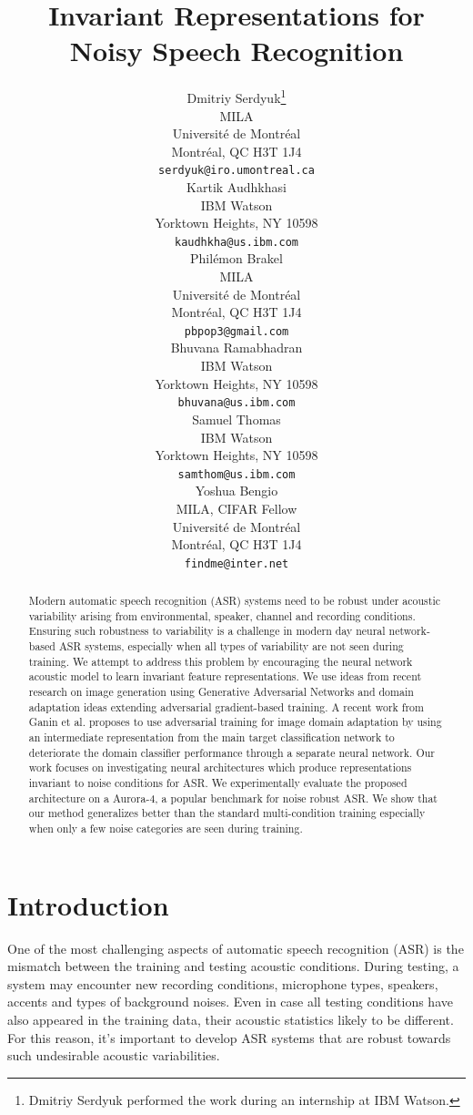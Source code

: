 \documentclass{article}
\title{Invariant Representations for Noisy Speech Recognition}
\author{
  Dmitriy Serdyuk\thanks{Dmitriy Serdyuk performed the work 
    during an internship at IBM Watson.} \\
  MILA\\
  Universit\'e de Montr\'eal\\
  Montr\'eal, QC H3T 1J4 \\
  \texttt{serdyuk@iro.umontreal.ca} \\
  \And
  Kartik Audhkhasi \\
  IBM Watson \\
  Yorktown Heights, NY 10598\\
  \texttt{kaudhkha@us.ibm.com} \\
  \And
  Phil\'emon Brakel \\
  MILA\\
  Universit\'e de Montr\'eal\\
  Montr\'eal, QC H3T 1J4 \\
  \texttt{pbpop3@gmail.com} \\
  \And
  Bhuvana Ramabhadran\\
  IBM Watson\\
  Yorktown Heights, NY 10598\\
  \texttt{bhuvana@us.ibm.com} \\
  \And
  Samuel Thomas\\
  IBM Watson\\
  Yorktown Heights, NY 10598\\
  \texttt{samthom@us.ibm.com} \\
  \And
  Yoshua Bengio\\
  MILA, CIFAR Fellow\\
  Universit\'e de Montr\'eal\\
  Montr\'eal, QC H3T 1J4 \\
  \texttt{findme@inter.net} \\
}
\begin{document}
%
\maketitle
%
\begin{abstract}
    Modern automatic speech recognition (ASR) systems need to be robust under acoustic variability arising from environmental, speaker, channel and recording conditions. Ensuring such robustness to variability is a challenge in modern day neural network-based ASR systems, especially when all types of variability are not seen during training. We attempt to address this problem by encouraging the neural network acoustic model to learn invariant feature representations.
    We use ideas from recent research on image generation using
    Generative Adversarial Networks and domain adaptation ideas extending
    adversarial gradient-based training. A recent work from Ganin et al. proposes to
    use adversarial training for image domain adaptation by using an intermediate
    representation from the main target classification network to deteriorate the domain 
    classifier performance through a separate neural network.
    Our work focuses on investigating neural architectures which produce
    representations invariant to noise conditions for ASR.  We
    experimentally evaluate the proposed architecture on a Aurora-4, a popular benchmark for
    noise robust ASR. We show that our method generalizes better than the standard multi-condition training especially when only a few noise categories are seen during training.
\end{abstract}
%
%
\section{Introduction}
\label{sec:intro}
    One of the most challenging aspects of automatic speech recognition (ASR)
    is the mismatch between the training and testing acoustic conditions. During
    testing, a system may encounter new recording conditions, microphone types, speakers,
    accents and types of background noises. Even in case all testing conditions have also appeared
    in the training data, their acoustic statistics likely to be
    different. For this reason, it's important to develop ASR systems that are
    robust towards such undesirable acoustic variabilities.
\end{document}
